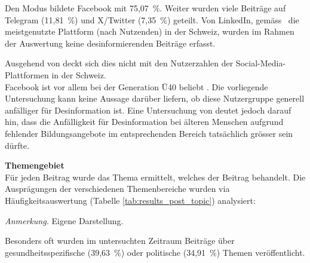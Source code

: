\documentclass[12pt,a4paper]{article}        %
\begin{document}
Den Modus bildete Facebook mit 75,07 \%. Weiter wurden viele Beiträge auf Telegram (11,81 \%) und X/Twitter (7,35 \%) geteilt. Von LinkedIn, gemäss~\cite{we_are_social_fuhrende_2025}  die meistgenutzte Plattform (nach Nutzenden) in der Schweiz, wurden im Rahmen der Auswertung keine desinformierenden Beiträge erfasst.

Ausgehend von \parencite{we_are_social_fuhrende_2025} deckt sich dies nicht mit den Nutzerzahlen der Social-Media-Plattformen in der Schweiz. \\
Facebook ist vor allem bei der Generation Ü40 beliebt \parencite[4]{igem__interessengemeinschaft_elektronische_medien_zusammenfassung_2024}. Die vorliegende Untersuchung kann keine Aussage darüber liefern, ob diese Nutzergruppe generell anfälliger für Desinformation ist. Eine Untersuchung von \textcite[15]{stegers_desinformation_2021} deutet jedoch darauf hin, dass die Anfälligkeit für Desinformation bei älteren Menschen aufgrund fehlender Bildungsangebote im entsprechenden Bereich tatsächlich grösser sein dürfte.

\textbf{Themengebiet}\\
Für jeden Beitrag wurde das Thema ermittelt, welches der Beitrag behandelt. Die Ausprägungen der verschiedenen Themenbereiche wurden via Häufigkeitsauswertung (Tabelle \ref{tab:results_post_topic}) analysiert:

\begin{table}[H]
  \caption{\textit{Relative Häufigkeitsverteilung der Themengebiete der Beiträge in \%}}
  \label{tab:results_post_topic}
  \centering
  \footnotesize\textit{Anmerkung.} Eigene Darstellung.
\end{table}
Besonders oft wurden im untersuchten Zeitraum Beiträge über gesundheitsspezifische (39,63 \%) oder politische (34,91 \%) Themen veröffentlicht.
\end{document}
